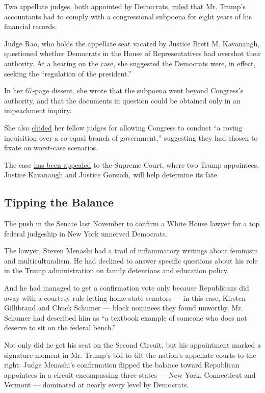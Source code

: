 Two appellate judges, both appointed by Democrats,
\href{https://www.nytimes3xbfgragh.onion/2019/10/11/us/politics/mazars-trump-tax-returns.html}{ruled}
that Mr. Trump's accountants had to comply with a congressional subpoena
for eight years of his financial records.

Judge Rao, who holds the appellate seat vacated by Justice Brett M.
Kavanaugh, questioned whether Democrats in the House of Representatives
had overshot their authority. At a hearing on the case, she suggested
the Democrats were, in effect, seeking the ``regulation of the
president.''

In her 67-page dissent, she wrote that the subpoena went beyond
Congress's authority, and that the documents in question could be
obtained only in an impeachment inquiry.

She also
\href{https://www.cadc.uscourts.gov/internet/opinions.nsf/20C16C3C5721030C85258490004DE33C/$file/19-5142-1810450.pdf}{chided}
her fellow judges for allowing Congress to conduct ``a roving
inquisition over a co-equal branch of government,'' suggesting they had
chosen to fixate on worst-case scenarios.

The case
\href{https://www.nytimes3xbfgragh.onion/2019/12/05/us/trump-supreme-court-mazars.html}{has
been appealed} to the Supreme Court, where two Trump appointees, Justice
Kavanaugh and Justice Gorsuch, will help determine its fate.

\hypertarget{tipping-the-balance}{%
\subsection{Tipping the Balance}\label{tipping-the-balance}}

The push in the Senate last November to confirm a White House lawyer for
a top federal judgeship in New York unnerved Democrats.

The lawyer, Steven Menashi had a trail of inflammatory writings about
feminism and multiculturalism. He had declined to answer specific
questions about his role in the Trump administration on family
detentions and education policy.

And he had managed to get a confirmation vote only because Republicans
did away with a courtesy rule letting home-state senators --- in this
case, Kirsten Gillibrand and Chuck Schumer --- block nominees they found
unworthy. Mr. Schumer had described him as ``a textbook example of
someone who does not deserve to sit on the federal bench.''

Not only did he get his seat on the Second Circuit, but his appointment
marked a signature moment in Mr. Trump's bid to tilt the nation's
appellate courts to the right: Judge Menashi's confirmation flipped the
balance toward Republican appointees in a circuit encompassing three
states --- New York, Connecticut and Vermont --- dominated at nearly
every level by Democrats.

